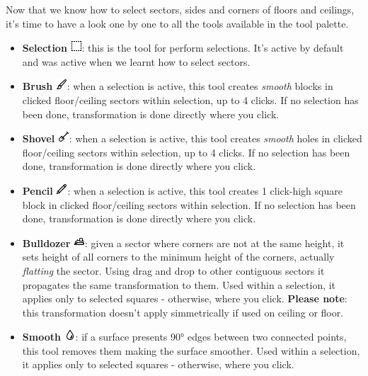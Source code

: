Now that we know how to select sectors, sides and corners of floors and ceilings, it's time to have a look one by one to all the tools available in the tool palette.

\begin{itemize}
    \item \textbf{Selection} \includegraphics[scale=0.5]{Resources/icons_toolbox/toolbox_Selection-16.png}: this is the tool for perform selections. It's active by default and was active when we learnt how to select sectors.
    \item \textbf{Brush} \includegraphics[scale=0.5]{Resources/icons_toolbox/toolbox_Paint-16.png}: when a selection is active, this tool creates \emph{smooth} blocks in  clicked floor/ceiling sectors within selection, up to 4 clicks. If no selection has been done, transformation is done directly where you click.
    \item \textbf{Shovel} \includegraphics[scale=0.5]{Resources/icons_toolbox/toolbox_Shovel-16.png}: when a selection is active, this tool creates \emph{smooth} holes in  clicked floor/ceiling sectors within selection, up to 4 clicks. If no selection has been done, transformation is done directly where you click.
    \item \textbf{Pencil} \includegraphics[scale=0.5]{Resources/icons_toolbox/toolbox_Pencil-16.png}: when a selection is active, this tool creates 1 click-high square block in  clicked floor/ceiling sectors within selection. If no selection has been done, transformation is done directly where you click.
    \item \textbf{Bulldozer} \includegraphics[scale=0.5]{Resources/icons_toolbox/toolbox_Bulldozer_1-16.png}: given a sector where corners are not at the same height, it sets height of all corners to the minimum height of the corners, actually \emph{flatting} the sector. Using drag and drop to other contiguous sectors it propagates the same transformation to them. Used within a selection, it applies only to selected squares - otherwise, where you click. \textbf{Please note}: this transformation doesn't apply simmetrically if used on ceiling or floor.
    \item \textbf{Smooth} \includegraphics[scale=0.5]{Resources/icons_toolbox/toolbox_Smooth-16.png}: if a surface presents 90° edges between two connected points, this tool removes them making the surface smoother. Used within a selection, it applies only to selected squares - otherwise, where you click.
\end{itemize}